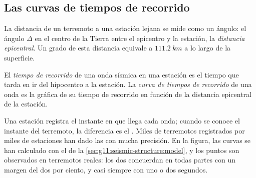 \subsection{Las curvas de tiempos de recorrido}

La distancia de un terremoto a una estación lejana se mide como un ángulo: el
ángulo $\Delta$ en el centro de la Tierra entre el epicentro y la estación, la
\emph{distancia epicentral}. Un grado de esta
distancia equivale a $\qty{111.2}{km}$ a lo largo de la superficie.

\begin{definition}\label{def:g11:seismic-structure:travel-time}
El \emph{tiempo de recorrido} de una onda sísmica
en una estación es el tiempo que tarda en ir del hipocentro a la estación. La
\emph{curva de tiempos de recorrido} de
una onda es la gráfica de su tiempo de recorrido en función de la distancia
epicentral de la estación.
\end{definition}

Una estación registra el instante en que llega cada onda; cuando se conoce el
instante del terremoto, la diferencia es el . Miles de
terremotos registrados por miles de estaciones han dado las  con mucha precisión. En la figura, las curvas se han calculado
con el  de la \cref{sec:g11:seismic-structure:model},
y los puntos son  observados en terremotos reales: los dos
concuerdan en todas partes con un margen del dos por ciento, y casi siempre
con uno o dos segundos.

